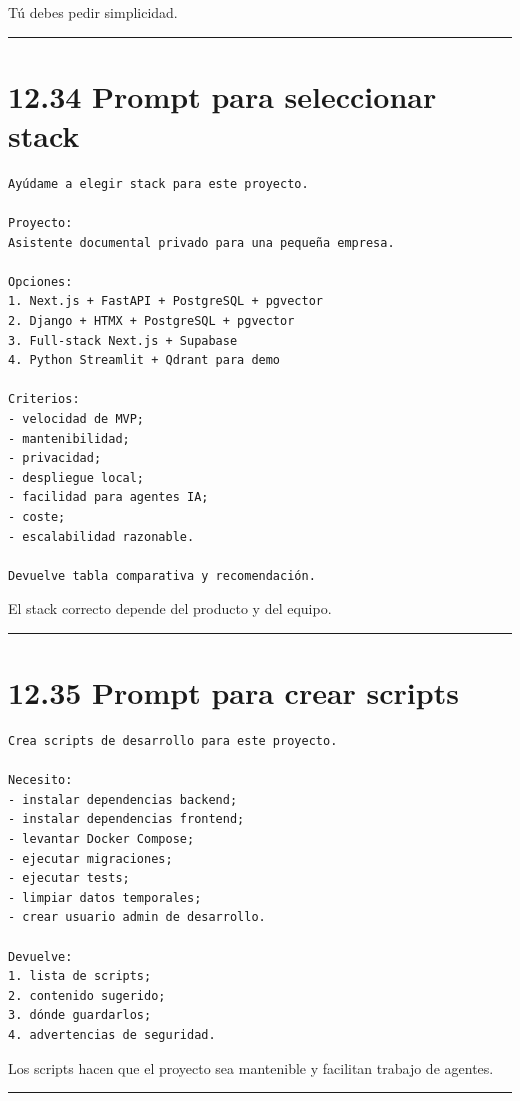 Tú debes pedir simplicidad.

\begin{center}\rule{0.5\linewidth}{0.5pt}\end{center}

\section{12.34 Prompt para seleccionar
stack}\label{prompt-para-seleccionar-stack}

\begin{lstlisting}
Ayúdame a elegir stack para este proyecto.

Proyecto:
Asistente documental privado para una pequeña empresa.

Opciones:
1. Next.js + FastAPI + PostgreSQL + pgvector
2. Django + HTMX + PostgreSQL + pgvector
3. Full-stack Next.js + Supabase
4. Python Streamlit + Qdrant para demo

Criterios:
- velocidad de MVP;
- mantenibilidad;
- privacidad;
- despliegue local;
- facilidad para agentes IA;
- coste;
- escalabilidad razonable.

Devuelve tabla comparativa y recomendación.
\end{lstlisting}

El stack correcto depende del producto y del equipo.

\begin{center}\rule{0.5\linewidth}{0.5pt}\end{center}

\section{12.35 Prompt para crear
scripts}\label{prompt-para-crear-scripts}

\begin{lstlisting}
Crea scripts de desarrollo para este proyecto.

Necesito:
- instalar dependencias backend;
- instalar dependencias frontend;
- levantar Docker Compose;
- ejecutar migraciones;
- ejecutar tests;
- limpiar datos temporales;
- crear usuario admin de desarrollo.

Devuelve:
1. lista de scripts;
2. contenido sugerido;
3. dónde guardarlos;
4. advertencias de seguridad.
\end{lstlisting}

Los scripts hacen que el proyecto sea mantenible y facilitan trabajo de
agentes.

\begin{center}\rule{0.5\linewidth}{0.5pt}\end{center}


